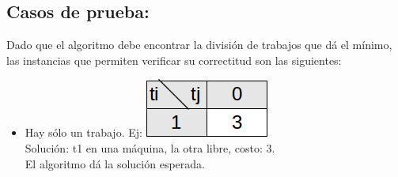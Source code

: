 \subsection{Casos de prueba:}

Dado que el algoritmo debe encontrar la división de trabajos que dá el mínimo, las instancias que permiten verificar su correctitud son las siguientes:
\begin{itemize}
\item Hay sólo un trabajo. Ej: \includegraphics[scale=0.6]{ej1/caso1.png} \\
Solución: t1 en una máquina, la otra libre, costo: 3.\\
El algoritmo dá la solución esperada.
\end{itemize}

